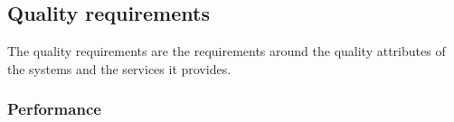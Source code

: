 \documentclass[letterpaper]{article}
\begin{document}
			\vspace{0.2in}
			\subsection*{ Quality requirements }
			\vspace{0.1in}
				
				The quality requirements are the requirements around the quality attributes of the systems and the
				services it provides.
				
				\subsubsection*{Performance}
				\vspace{0.1in}
				
\end{document}
